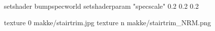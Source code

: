 setshader bumpspecworld
setshaderparam "specscale" 0.2 0.2 0.2

texture 0 makke/stairtrim.jpg
texture n makke/stairtrim_NRM.png
